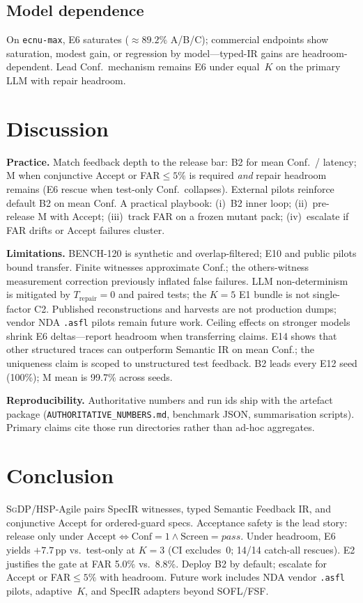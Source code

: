 \documentclass[10pt,conference]{IEEEtran}
\newcommand{\runin}[1]{\medskip\noindent\textbf{#1}\enspace}
\begin{document}
\subsection{Model dependence}
On \texttt{ecnu-max}, E6 saturates (${\approx}89.2\%$ A/B/C); commercial
endpoints show saturation, modest gain, or regression by model---typed-IR
gains are headroom-dependent.
Lead Conf.\ mechanism remains E6 under equal~$K$ on the primary LLM with
repair headroom.

\section{Discussion}
\runin{Practice.}
Match feedback depth to the release bar: B2 for mean Conf.\ / latency; M when
conjunctive Accept or FAR${\le}5\%$ is required \emph{and} repair headroom
remains (E6 rescue when test-only Conf.\ collapses).
External pilots reinforce default B2 on mean Conf.
A practical playbook: (i)~B2 inner loop; (ii)~pre-release M with Accept;
(iii)~track FAR on a frozen mutant pack; (iv)~escalate if FAR drifts or Accept
failures cluster.

\runin{Limitations.}
BENCH-120 is synthetic and overlap-filtered; E10 and public pilots bound
transfer.
Finite witnesses approximate Conf.; the others-witness measurement correction
previously inflated false failures.
LLM non-determinism is mitigated by $T_\text{repair}{=}0$ and paired tests;
the $K{=}5$ E1 bundle is not single-factor C2.
Published reconstructions and harvests are not production dumps; vendor NDA
\texttt{.asfl} pilots remain future work.
Ceiling effects on stronger models shrink E6 deltas---report headroom when
transferring claims.
E14 shows that other structured traces can outperform Semantic IR on mean
Conf.; the uniqueness claim is scoped to unstructured test feedback.
B2 leads every E12 seed (100\%); M mean is 99.7\% across seeds.

\runin{Reproducibility.}
Authoritative numbers and run ids ship with the artefact package
(\texttt{AUTHORITATIVE\_NUMBERS.md}, benchmark JSON, summarisation scripts).
Primary claims cite those run directories rather than ad-hoc aggregates.

\section{Conclusion}
\textsc{SgDP}/HSP-Agile pairs SpecIR witnesses, typed Semantic Feedback IR, and
conjunctive Accept for ordered-guard specs.
Acceptance safety is the lead story: release only under
$\mathrm{Accept}\Leftrightarrow\mathrm{Conf}{=}1\wedge\mathrm{Screen}{=}\mathit{pass}$.
Under headroom, E6 yields ${+}7.7$\,pp vs.\ test-only at $K{=}3$ (CI
excludes~0; 14/14 catch-all rescues).
E2 justifies the gate at FAR 5.0\% vs.\ 8.8\%.
Deploy B2 by default; escalate for Accept or FAR${\le}5\%$ with headroom.
Future work includes NDA vendor \texttt{.asfl} pilots, adaptive~$K$, and
SpecIR adapters beyond SOFL/FSF.



\balance
\end{document}
